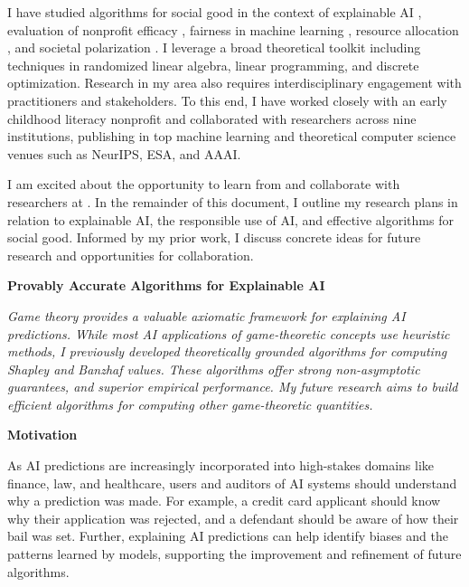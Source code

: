\documentclass[11pt]{article}
\begin{document}
{I have studied algorithms for social good in the context of explainable AI \cite{musco2024leverage,liu2024kernel}, evaluation of nonprofit efficacy \cite{witter2024benchmarking}, fairness in machine learning \cite{rosenblatt2023counterfactual,witter2024fairlyuncertain}, resource allocation \cite{hellerstein2022local,witter2024i,witter2024minimizing}, and societal polarization \cite{musco2022quantify}. I leverage a broad theoretical toolkit including techniques in randomized linear algebra, linear programming, and discrete optimization. Research in my area also requires interdisciplinary engagement with practitioners and stakeholders. To this end, I have worked closely with an early childhood literacy nonprofit and collaborated with researchers across nine institutions, publishing in top machine learning and theoretical computer science venues such as NeurIPS, ESA, and AAAI.

I am excited about the opportunity to learn from and collaborate with researchers at \school. In the remainder of this document, I outline my research plans in relation to explainable AI, the responsible use of AI, and effective algorithms for social good. Informed by my prior work, I discuss concrete ideas for future research and opportunities for collaboration.

\begin{center}
{ \large \textbf{Provably Accurate Algorithms for Explainable AI}}
\end{center}

\textit{Game theory provides a valuable axiomatic framework for explaining AI predictions. While most AI applications of game-theoretic concepts use heuristic methods, I previously developed theoretically grounded algorithms for computing Shapley and Banzhaf values.
These algorithms offer strong non-asymptotic guarantees, and superior empirical performance. My future research aims to build efficient algorithms for computing other game-theoretic quantities.}

{ \large \textbf{Motivation}}

As AI predictions are increasingly incorporated into high-stakes domains like finance, law, and healthcare, users and auditors of AI systems should understand why a prediction was made. For example, a credit card applicant should know why their application was rejected, and a defendant should be aware of how their bail was set. 
Further, explaining AI predictions can help identify biases and the patterns learned by models, supporting the improvement and refinement of future algorithms.

}
\end{document}
